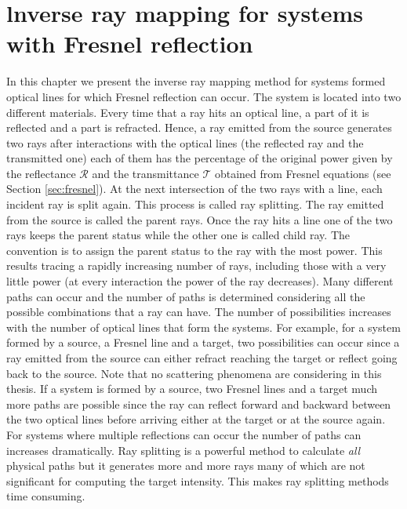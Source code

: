 \chapter{lnverse ray mapping for systems with Fresnel reflection}
\label{chap:fresnel}
In this chapter we present the inverse ray mapping method for systems formed optical lines for which Fresnel reflection can occur. The system is located into two different materials. Every time that a ray hits an optical line, a part of it is reflected and a part is refracted. 
Hence, a ray emitted from the source generates two rays after interactions with the optical lines (the reflected ray and the transmitted one) each of them has the percentage of the original power given by the reflectance $\mathcal{R}$ and the transmittance $\mathcal{T}$ obtained from Fresnel equations (see Section \ref{sec:fresnel}).
At the next intersection of the two rays with a line, each incident ray is split
again. This process is called ray splitting. The ray emitted from the source is called the parent rays. Once the ray hits a line one of the two rays keeps the parent status while the other one is called child ray. The convention is to assign the parent status to the ray with the most power.
This results tracing a rapidly increasing number of rays, including those with a very little power (at every interaction the power of the ray decreases). 
Many different paths can occur and the number of paths is determined considering all the possible combinations that a ray can have. The number of possibilities increases with the number of optical lines that form the systems. For example, for a system formed by a source, a Fresnel line and a target, two possibilities can occur since a ray emitted from the source can either refract reaching the target or reflect going back to the source. Note that no scattering phenomena are considering in this thesis. If a system is formed by a source, two Fresnel lines and a target much more paths are possible since the ray can reflect forward and backward between the two optical lines before arriving either at the target or at the source again. For systems where multiple reflections can occur the number of paths can increases dramatically. 
Ray splitting is a powerful method to calculate \textit{all} physical paths but it generates more and more rays many of which are not significant for computing the target intensity. This makes ray splitting methods time consuming. 
